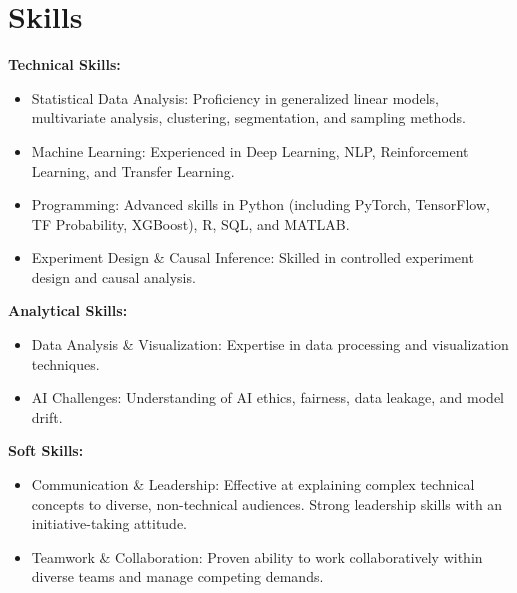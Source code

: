 \section{Skills}
\textbf{Technical Skills:}
\begin{itemize}[leftmargin=*]
    \item Statistical Data Analysis: Proficiency in generalized linear models, multivariate analysis, clustering, segmentation, and sampling methods.
    \item Machine Learning: Experienced in Deep Learning, NLP, Reinforcement Learning, and Transfer Learning.
    \item Programming: Advanced skills in Python (including PyTorch, TensorFlow, TF Probability, XGBoost), R, SQL, and MATLAB.
    \item Experiment Design \& Causal Inference: Skilled in controlled experiment design and causal analysis.
\end{itemize}
\textbf{Analytical Skills:}
\begin{itemize}[leftmargin=*]
    \item Data Analysis \& Visualization: Expertise in data processing and visualization techniques.
    \item AI Challenges: Understanding of AI ethics, fairness, data leakage, and model drift.
\end{itemize}
\textbf{Soft Skills:}
\begin{itemize}[leftmargin=*]
    \item Communication \& Leadership: Effective at explaining complex technical concepts to diverse, non-technical audiences. Strong leadership skills with an initiative-taking attitude.
    \item Teamwork \& Collaboration: Proven ability to work collaboratively within diverse teams and manage competing demands.
\end{itemize}



